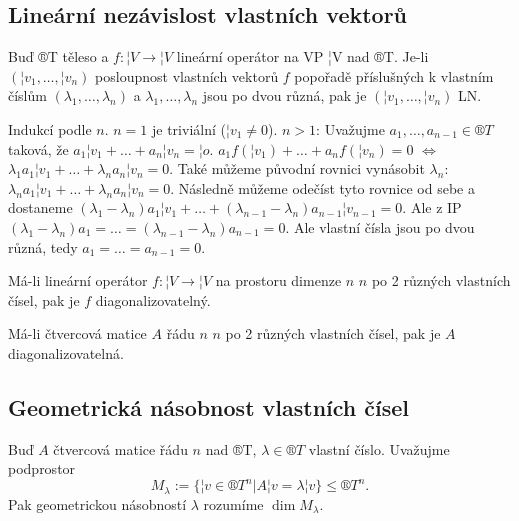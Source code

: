 \documentclass[12pt]{article}                   %
\begin{document}
    \subsection{Lineární nezávislost vlastních vektorů}
        \begin{veta}
            Buď ®T těleso a $f: ¦V \rightarrow ¦V$ lineární operátor na VP ¦V nad ®T. Je-li $(¦v_1, …, ¦v_n)$ posloupnost vlastních vektorů $f$ popořadě příslušných k vlastním číslům $(\lambda_1, …, \lambda_n)$ a $\lambda_1, …, \lambda_n$ jsou po dvou různá, pak je $(¦v_1, …, ¦v_n)$ LN.

            \begin{dukazin}
                Indukcí podle $n$. $n=1$ je triviální ($¦v_1 ≠ 0$). $n>1$: Uvažujme $a_1, …, a_{n-1} \in ®T$ taková, že $a_1¦v_1 + … + a_n¦v_n = ¦o$. $a_1f(¦v_1) + … + a_nf(¦v_n) = 0$ $\Leftrightarrow$ $\lambda_1a_1¦v_1 + … + \lambda_na_n¦v_n = 0$. Také můžeme původní rovnici vynásobit $\lambda_n$: $\lambda_na_1¦v_1 + … + \lambda_na_n¦v_n = 0$. Následně můžeme odečíst tyto rovnice od sebe a dostaneme $(\lambda_1 - \lambda_n)a_1¦v_1 + … + (\lambda_{n-1} - \lambda_n)a_{n-1}¦v_{n-1} = 0$. Ale z IP $(\lambda_1 - \lambda_n)a_1 = … = (\lambda_{n-1} - \lambda_n)a_{n-1} = 0$. Ale vlastní čísla jsou po dvou různá, tedy $a_1 = … = a_{n-1} = 0$.
            \end{dukazin}
        \end{veta}

        \begin{dusledek}
            Má-li lineární operátor $f: ¦V \rightarrow ¦V$ na prostoru dimenze $n$ $n$ po 2 různých vlastních čísel, pak je $f$ diagonalizovatelný.

            Má-li čtvercová matice $A$ řádu $n$ $n$ po 2 různých vlastních čísel, pak je $A$ diagonalizovatelná.
        \end{dusledek}


    \subsection{Geometrická násobnost vlastních čísel}
        \begin{definice}
            Buď $A$ čtvercová matice řádu $n$ nad ®T, $\lambda \in ®T$ vlastní číslo. Uvažujme podprostor
            $$ M_\lambda := \{¦v \in ®T^n | A¦v = \lambda ¦v\} ≤ ®T^n. $$
            Pak geometrickou násobností $\lambda$ rozumíme $\dim M_\lambda$.
        \end{definice}
\end{document}
